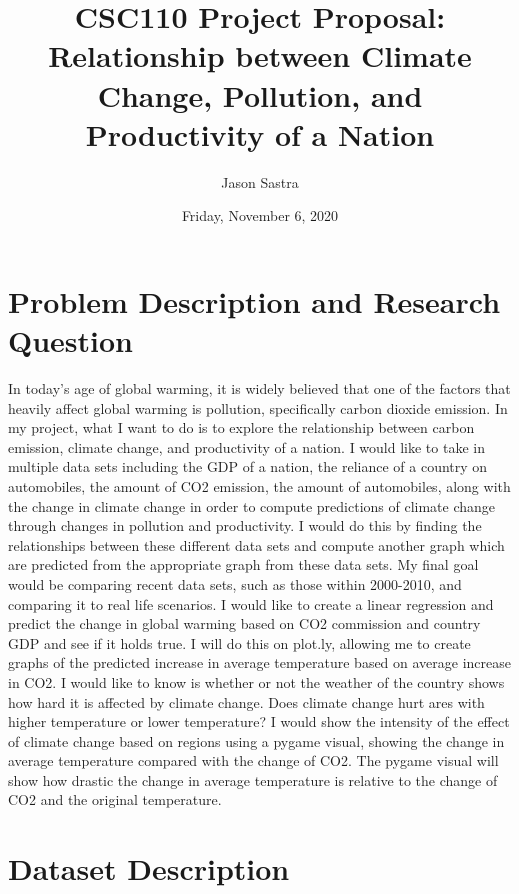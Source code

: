 \documentclass[fontsize=11pt]{article}
\title{CSC110 Project Proposal: Relationship between Climate Change, Pollution, and Productivity of a Nation}
\author{Jason Sastra}
\date{Friday, November 6, 2020}
\begin{document}
\maketitle

\section*{Problem Description and Research Question}

In today's age of global warming, it is widely believed that one of the factors that heavily affect global warming is pollution, specifically carbon dioxide emission. In my project, what I want to do is to explore the relationship between carbon emission, climate change, and productivity of a nation. I would like to take in multiple data sets including the GDP of a nation, the reliance of a country on automobiles, the amount of CO2 emission, the amount of automobiles, along with the change in climate change in order to compute predictions of climate change through changes in pollution and productivity. I would do this by finding the relationships between these different data sets and compute another graph which are predicted from the appropriate graph from these data sets. My final goal would be comparing recent data sets, such as those within 2000-2010, and comparing it to real life scenarios. I would like to create a linear regression and predict the change in global warming based on CO2 commission and country GDP and see if it holds true. I will do this on plot.ly, allowing me to create graphs of the predicted increase in average temperature based on average increase in CO2. I would like to know is whether or not the weather of the country shows how hard it is affected by climate change. Does climate change hurt ares with higher temperature or lower temperature? I would show the intensity of the effect of climate change based on regions using a pygame visual, showing the change in average temperature compared with the change of CO2. The pygame visual will show how drastic the change in average temperature is relative to the change of CO2 and the original temperature.

\section*{Dataset Description}
\end{document}
